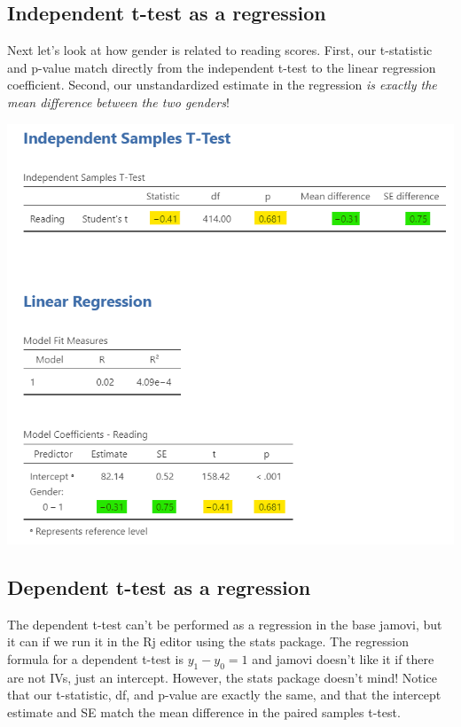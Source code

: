 \documentclass[
]{book}
\begin{document}
\hypertarget{independent-t-test-as-a-regression}{%
\subsection{Independent t-test as a regression}\label{independent-t-test-as-a-regression}}

Next let's look at how gender is related to reading scores. First, our t-statistic and p-value match directly from the independent t-test to the linear regression coefficient. Second, our unstandardized estimate in the regression \emph{is exactly the mean difference between the two genders}!

\includegraphics{images/14-regression-wrap-up/t-test.png}

\hypertarget{dependent-t-test-as-a-regression}{%
\subsection{Dependent t-test as a regression}\label{dependent-t-test-as-a-regression}}

The dependent t-test can't be performed as a regression in the base jamovi, but it can if we run it in the Rj editor using the stats package. The regression formula for a dependent t-test is \(y_1 -y_0 = 1\) and jamovi doesn't like it if there are not IVs, just an intercept. However, the stats package doesn't mind! Notice that our t-statistic, df, and p-value are exactly the same, and that the intercept estimate and SE match the mean difference in the paired samples t-test.
\end{document}
